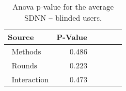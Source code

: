 
\begin{table}[H]
\centering
\caption{Anova p-value for the average SDNN -- blinded users.}
\label{tab:blocdanova_sdnn_two_way_blind}
\begin{tabular}{lrrrrr}
\toprule
          Source & P-Value \\
\midrule
    \    Methods &   0.486 \\
     \    Rounds &   0.223 \\
\    Interaction &   0.473 \\
\bottomrule
\end{tabular}
\end{table}

